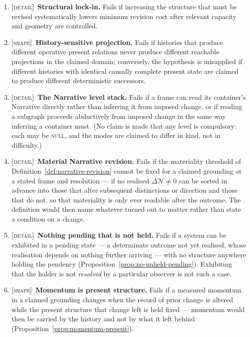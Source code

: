 \documentclass[11pt,a4paper]{article}
\theoremstyle{remark}
\newcommand{\Narr}{\mathcal N}
\begin{document}
\begin{enumerate}[leftmargin=*]
\item \textsc{[detail]}~\textbf{Structural lock-in.} Fails if increasing the structure that must be revised systematically lowers minimum revision cost after relevant capacity and geometry are controlled.
\item \textsc{[shape]}~\textbf{History-sensitive projection.} Fails if histories that produce different operative present relations never produce different reachable projections in the claimed domain; conversely, the hypothesis is misapplied if different histories with identical causally complete present state are claimed to produce different deterministic successors.
\item \textsc{[detail]}~\textbf{The Narrative level stack.} Fails if a frame can read its container's Narrative directly rather than inferring it from imposed change, or if reading a subgraph proceeds abductively from imposed change in the same way inferring a container must. (No claim is made that any level is compulsory: each may be \textsc{null}, and the modes are claimed to differ in kind, not in difficulty.)
\item \textsc{[detail]}~\textbf{Material Narrative revision.} Fails if the materiality threshold of Definition~\ref{def:narrative-revision} cannot be fixed for a claimed grounding at a stated frame and resolution --- if no realised $\Delta\Narr\neq0$ can be sorted in advance into those that alter subsequent distinctions or direction and those that do not, so that materiality is only ever readable after the outcome. The definition would then name whatever turned out to matter rather than state a condition on a change.
\item \textsc{[detail]}~\textbf{Nothing pending that is not held.} Fails if a system can be exhibited in a pending state --- a determinate outcome not yet realised, whose realisation depends on nothing further arriving --- with no structure anywhere holding the pendency (Proposition~\ref{prop:no-unheld-pending}). Exhibiting that the holder is not \emph{resolved} by a particular observer is not such a case.
\item \textsc{[shape]}~\textbf{Momentum is present structure.} Fails if a measured momentum in a
claimed grounding changes when the record of prior change is altered while the present structure that
change left is held fixed --- momentum would then be carried by the history and not by what it left
behind (Proposition~\ref{prop:momentum-present}).
\end{enumerate}
\end{document}
